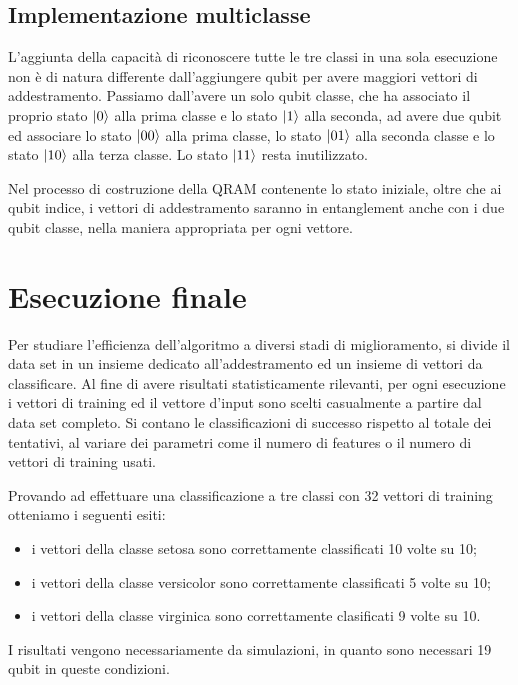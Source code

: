 \subsection{Implementazione multiclasse}

L'aggiunta della capacità di riconoscere tutte le tre classi in una sola esecuzione 
non è di natura differente dall'aggiungere qubit per avere maggiori vettori 
di addestramento. Passiamo dall'avere un solo qubit classe, che ha associato il 
proprio stato  
$\ket{0}$ alla prima classe e lo stato $\ket{1}$ alla seconda, ad avere due qubit 
ed associare lo stato $\ket{00}$ alla prima classe, lo stato $\ket{01}$ alla 
seconda classe e lo stato $\ket{10}$ alla terza classe. Lo stato $\ket{11}$ resta 
inutilizzato. 

Nel processo di costruzione della \ac{QRAM} contenente lo stato iniziale, 
oltre che ai qubit indice, i vettori di addestramento saranno in entanglement 
anche con i due qubit classe, nella maniera appropriata per ogni vettore. 

\section{Esecuzione finale}

Per studiare l'efficienza dell'algoritmo a diversi stadi di miglioramento, 
si divide il data set in un insieme dedicato all'addestramento ed un insieme 
di vettori da classificare. Al fine di avere risultati statisticamente 
rilevanti, per ogni esecuzione i vettori di training ed il vettore d'input 
sono scelti casualmente a partire dal data set completo. 
Si contano le classificazioni di successo 
rispetto al totale dei tentativi, al variare dei parametri come il numero 
di features o il numero di vettori di training usati. 

Provando ad effettuare una classificazione a tre classi con 32 vettori di 
training otteniamo i seguenti esiti: 
\begin{itemize}
    \item i vettori della classe setosa sono correttamente classificati 10 volte su 10;
    \item i vettori della classe versicolor sono correttamente classificati 5 volte su 10;
    \item i vettori della classe virginica sono correttamente clasificati 9 volte su 10.
\end{itemize}
I risultati vengono necessariamente da simulazioni, in quanto sono necessari 
19 qubit in queste condizioni. 





